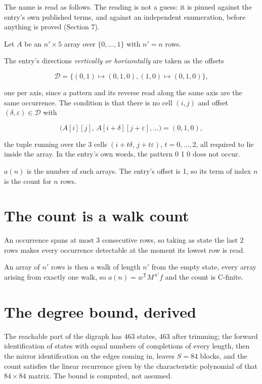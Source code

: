 \documentclass[11pt]{article}
\theoremstyle{definition}
\begin{document}
The name is read as follows. The reading is not a guess: it is pinned against the entry's own published terms, and against an independent enumeration, before anything is proved (Section 7).

Let $A$ be an $n' \times 5$ array over $\{0,\dots,1\}$ with $n' = n$ rows.

The entry's directions {\itshape vertically or horizontally} are taken as the offsets

\[\mathcal{D} = \{(0,1)\mapsto(0,1,0), (1,0)\mapsto(0,1,0)\},\]

one per axis, since a pattern and its reverse read along the same axis are the same occurrence. The condition is that there is no cell $(i,j)$ and offset $(\delta,\varepsilon)\in\mathcal{D}$ with

\[\bigl(A[i][j],\,A[i{+}\delta][j{+}\varepsilon],\dots\bigr) = (0, 1, 0),\]

the tuple running over the $3$ cells $(i+t\delta,\,j+t\varepsilon)$, $t = 0,\dots,2$, all required to lie inside the array. In the entry's own words, the pattern 0 1 0 does not occur.

$a(n)$ is the number of such arrays. The entry's offset is 1, so its term of index $n$ is the count for $n$ rows.

\section{The count is a walk count}

An occurrence spans at most $3$ consecutive rows, so taking as state the last $2$ rows makes every occurrence detectable at the moment its lowest row is read.

An array of $n'$ rows is then a walk of length $n'$ from the empty state, every array arising from exactly one walk, so $a(n) = w^{\mathsf T}M^{\,n'}f$ and the count is C-finite.

\section{The degree bound, derived}

The reachable part of the digraph has $463$ states, $463$ after trimming; the forward identification of states with equal numbers of completions of every length, then the mirror identification on the edges coming in, leaves $S = 84$ blocks, and the count satisfies the linear recurrence given by the characteristic polynomial of that $84\times84$ matrix. The bound is computed, not assumed.
\end{document}
